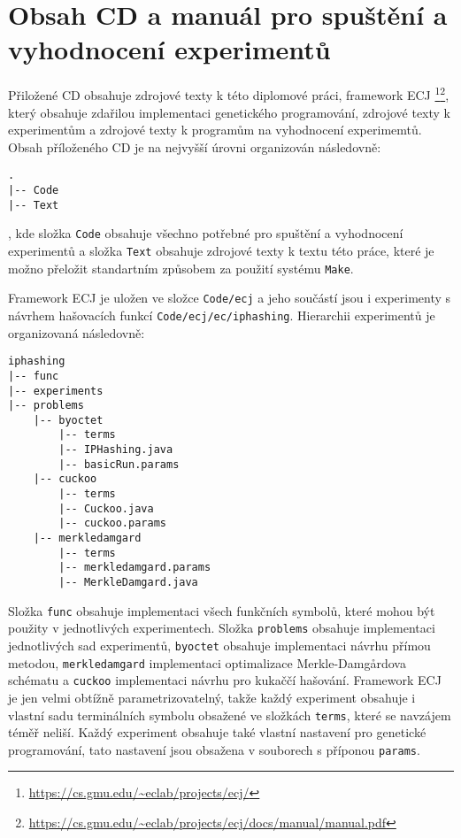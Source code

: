 \chapter{Obsah CD a manuál pro spuštění a vyhodnocení experimentů}

Přiložené CD obsahuje zdrojové texty k této diplomové práci, framework ECJ
\footnote{\url{https://cs.gmu.edu/~eclab/projects/ecj/}}\footnote{\url{https://cs.gmu.edu/~eclab/projects/ecj/docs/manual/manual.pdf}},  který obsahuje zdařilou implementaci genetického
programování, zdrojové texty k experimentům a zdrojové texty k programům na vyhodnocení experimemtů. Obsah příloženého CD
je na nejvyšší úrovni organizován následovně:
\begin{verbatim}
.
|-- Code
|-- Text	
\end{verbatim}
, kde složka \texttt{Code} obsahuje všechno potřebné pro spuštění a vyhodnocení experimentů a složka \texttt{Text} obsahuje zdrojové
texty k textu této práce, které je možno přeložit standartním způsobem za použití systému \texttt{Make}.

Framework ECJ je uložen ve složce \texttt{Code/ecj} a jeho součástí jsou i experimenty s návrhem hašovacích funkcí \texttt{Code/ecj/ec/iphashing}. 
Hierarchii experimentů je organizovaná následovně:
\begin{verbatim}
iphashing
|-- func
|-- experiments
|-- problems
    |-- byoctet
        |-- terms
        |-- IPHashing.java
        |-- basicRun.params
    |-- cuckoo
        |-- terms
        |-- Cuckoo.java
        |-- cuckoo.params
    |-- merkledamgard
        |-- terms
        |-- merkledamgard.params
        |-- MerkleDamgard.java
\end{verbatim}
Složka \texttt{func} obsahuje implementaci všech funkčních symbolů, které mohou být použity v jednotlivých experimentech. Složka \texttt{problems}
obsahuje implementaci jednotlivých sad experimentů, \texttt{byoctet} obsahuje implementaci návrhu přímou metodou, \texttt{merkledamgard} implementaci
optimalizace Merkle-Damg\r{a}rdova schématu a \texttt{cuckoo} implementaci návrhu pro kukaččí hašování. Framework ECJ je jen velmi obtížně 
parametrizovatelný, takže každý experiment obsahuje i vlastní sadu terminálních symbolu obsažené ve složkách \texttt{terms}, které se navzájem
téměř neliší. Každý experiment obsahuje také vlastní nastavení pro genetické programování, tato nastavení jsou obsažena v souborech
s příponou \texttt{params}.


